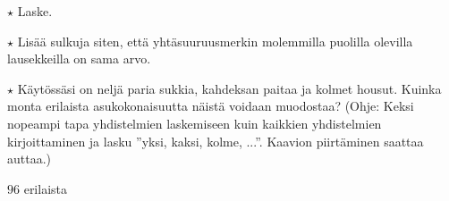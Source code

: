 \begin{tehtavasivu}
\begin{tehtava}
$\star$ Laske.
\begin{vastaus}
\end{vastaus}
\end{tehtava}

\begin{tehtava}
$\star$ Lisää sulkuja siten, että yhtäsuuruusmerkin molemmilla puolilla olevilla lausekkeilla on sama arvo.
    \begin{vastaus}
    \end{vastaus}
\end{tehtava}

\begin{tehtava}
$\star$ Käytössäsi on neljä paria sukkia, kahdeksan paitaa ja kolmet housut. Kuinka monta erilaista asukokonaisuutta näistä voidaan muodostaa? (Ohje: Keksi nopeampi tapa yhdistelmien laskemiseen kuin kaikkien yhdistelmien kirjoittaminen ja lasku ''yksi, kaksi, kolme, ...''. Kaavion piirtäminen saattaa auttaa.)
	\begin{vastaus}
	$96$ erilaista
	\end{vastaus}
\end{tehtava}
\end{tehtavasivu}